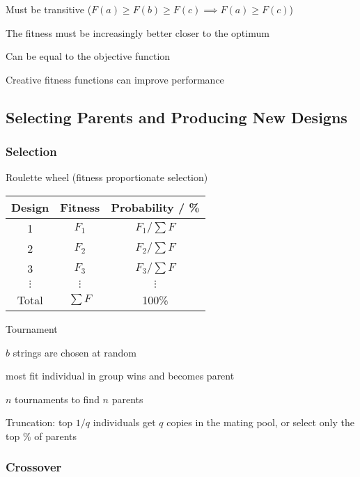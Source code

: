 \documentclass{article}
\begin{document}
\begin{itemize*}
\item Must be transitive (\(F(a) \ge F(b) \ge F(c) \implies F(a) \ge F(c)\))
\item The fitness must be increasingly better closer to the optimum
\item Can be equal to the objective function
\item Creative fitness functions can improve performance
\end{itemize*}

\subsection*{Selecting Parents and Producing New Designs}

\subsubsection*{Selection}

\begin{itemize*}
\item Roulette wheel (fitness proportionate selection)
  \begin{tabular}{ccc}
    \toprule
    Design & Fitness & Probability / \% \\
    \midrule
    1 & \(F_1\) & \(F_1 / \sum{F}\) \\
    2 & \(F_2\) & \(F_2 / \sum{F}\) \\
    3 & \(F_3\) & \(F_3 / \sum{F}\) \\
    \(\vdots\) & \(\vdots\) & \(\vdots\) \\
    \midrule
    Total & \(\sum{F}\) & 100\% \\
    \bottomrule
  \end{tabular}
\item Tournament
  \begin{itemize*}
  \item \(b\) strings are chosen at random
  \item most fit individual in group wins and becomes parent
  \item \(n\) tournaments to find \(n\) parents
  \end{itemize*}
\item Truncation: top \(1/q\) individuals get \(q\)
  copies in the mating pool, or select only the top \% of parents
\end{itemize*}

\subsubsection*{Crossover}
\end{document}
